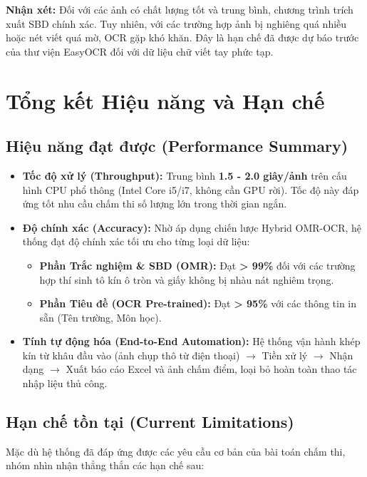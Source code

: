 \documentclass[6pt, a4paper]{report}
\begin{document}
	\textbf{Nhận xét:} 
	Đối với các ảnh có chất lượng tốt và trung bình, chương trình trích xuất SBD chính xác. Tuy nhiên, với các trường hợp ảnh bị nghiêng quá nhiều hoặc nét viết quá mờ, OCR gặp khó khăn. Đây là hạn chế đã được dự báo trước của thư viện EasyOCR đối với dữ liệu chữ viết tay phức tạp.
	
	\section{Tổng kết Hiệu năng và Hạn chế}
	
	\subsection{Hiệu năng đạt được (Performance Summary)}
	\begin{itemize}
		\item \textbf{Tốc độ xử lý (Throughput):} 
		Trung bình \textbf{1.5 - 2.0 giây/ảnh} trên cấu hình CPU phổ thông (Intel Core i5/i7, không cần GPU rời). Tốc độ này đáp ứng tốt nhu cầu chấm thi số lượng lớn trong thời gian ngắn.
		
		\item \textbf{Độ chính xác (Accuracy):} Nhờ áp dụng chiến lược Hybrid OMR-OCR, hệ thống đạt độ chính xác tối ưu cho từng loại dữ liệu:
		\begin{itemize}
			\item \textbf{Phần Trắc nghiệm \& SBD (OMR):} Đạt \textbf{> 99\%} đối với các trường hợp thí sinh tô kín ô tròn và giấy không bị nhàu nát nghiêm trọng.
			\item \textbf{Phần Tiêu đề (OCR Pre-trained):} Đạt \textbf{> 95\%} với các thông tin in sẵn (Tên trường, Môn học).
		\end{itemize}
		
		\item \textbf{Tính tự động hóa (End-to-End Automation):} 
		Hệ thống vận hành khép kín từ khâu đầu vào (ảnh chụp thô từ điện thoại) $\rightarrow$ Tiền xử lý $\rightarrow$ Nhận dạng $\rightarrow$ Xuất báo cáo Excel và ảnh chấm điểm, loại bỏ hoàn toàn thao tác nhập liệu thủ công.
	\end{itemize}
	
	\subsection{Hạn chế tồn tại (Current Limitations)}
	Mặc dù hệ thống đã đáp ứng được các yêu cầu cơ bản của bài toán chấm thi, nhóm nhìn nhận thẳng thắn các hạn chế sau:
	
\end{document}
